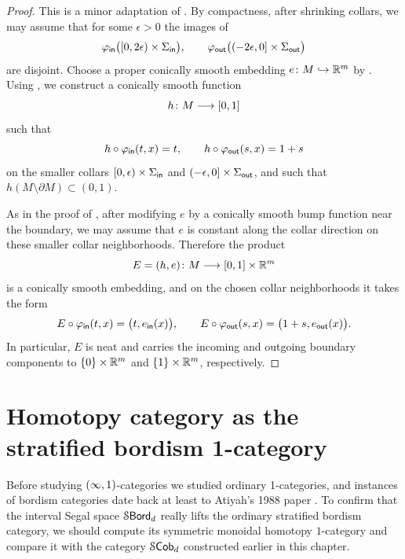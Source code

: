\begin{proof}
    This is a minor adaptation of . By compactness, after shrinking collars, we may assume that for some $\epsilon>0$ the images of
    \begin{equation}
        \varphi_{\sf in}\big([0,2\epsilon)\times \Sigma_{\sf in}\big), \qquad \varphi_{\sf out}\big((-2\epsilon,0]\times \Sigma_{\sf out}\big)
    \end{equation}
    are disjoint. Choose a proper conically smooth embedding $e\colon M \hookrightarrow \mathbb R^{m}$ by . Using , we construct a conically smooth function
    \begin{equation}
        h\colon M \longrightarrow [0,1]
    \end{equation}
    such that
    \begin{equation}
        h\circ \varphi_{\sf in}(t,x)=t, \qquad h\circ \varphi_{\sf out}(s,x)=1+s
    \end{equation}
    on the smaller collars $[0,\epsilon)\times \Sigma_{\sf in}$ and $(-\epsilon,0]\times \Sigma_{\sf out}$, and such that $h(M\setminus \partial M)\subset (0,1)$.

    As in the proof of , after modifying $e$ by a conically smooth bump function near the boundary, we may assume that $e$ is constant along the collar direction on these smaller collar neighborhoods. Therefore the product
    \begin{equation}
        E=(h,e)\colon M \longrightarrow [0,1]\times \mathbb R^{m}
    \end{equation}
    is a conically smooth embedding, and on the chosen collar neighborhoods it takes the form
    \begin{equation}
        E\circ \varphi_{\sf in}(t,x)=\big(t,e_{\sf in}(x)\big), \qquad E\circ \varphi_{\sf out}(s,x)=\big(1+s,e_{\sf out}(x)\big).
    \end{equation}
    In particular, $E$ is neat and carries the incoming and outgoing boundary components to $\{0\}\times \mathbb R^{m}$ and $\{1\}\times \mathbb R^{m}$, respectively.
\end{proof}

\section{Homotopy category as the stratified bordism 1-category}

    Before studying $(\operatorname{\infty},1)$-categories we studied ordinary 1-categories, and instances of bordism categories date back at least to Atiyah's 1988 paper \cite{At88}. To confirm that the interval Segal space $\operatorname{\mathcal S\mathsf{Bord}}_d$ really lifts the ordinary stratified bordism category, we should compute its symmetric monoidal homotopy $1$-category and compare it with the category $\mathcal S\mathsf{Cob}_d$ constructed earlier in this chapter.


